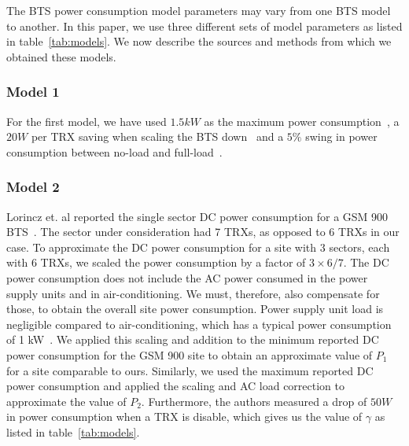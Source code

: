 The BTS power consumption model parameters may vary from one BTS model to another. In this paper, we use three different sets of model parameters as listed in table~\ref{tab:models}. We now describe the sources and methods from which we obtained these models.
\subsubsection{Model 1}
\label{subsubsec:model1}For the first model, we have used $1.5kW$ as the maximum power consumption~\cite{mbakwe:btshybribpower:2011:necec}, a $20W$ per TRX saving when scaling the BTS down~\cite{flexibsc} and a $5\%$ swing in power consumption between no-load and full-load~\cite{Peng:2011:BTSSaving:Mobicom}.

\subsubsection{Model 2}
\label{subsubsec:model2} Lorincz et. al reported the single sector DC power consumption for a GSM 900 BTS~\cite{Lorincz:BTS-Measure:Sensors:2012}. The sector under consideration had 7 TRXs, as opposed to 6 TRXs in our case. To approximate the DC power consumption for a site with 3 sectors, each with 6 TRXs, we scaled the power consumption by a factor of $3\times6/7$. The DC power consumption does not include the AC power consumed in the power supply units and in air-conditioning. We must, therefore, also compensate for those, to obtain the overall site power consumption. Power supply unit load is negligible compared to air-conditioning, which has a typical power consumption of 1 kW~\cite{mbakwe:btshybribpower:2011:necec}. We applied this scaling and addition to the minimum reported DC power consumption for the GSM 900 site to obtain an approximate value of $P_1$ for a site comparable to ours. Similarly, we used the maximum reported DC power consumption and applied the scaling and AC load correction to approximate the value of $P_2$. Furthermore, the authors measured a drop of $50W$ in power consumption when a TRX is disable, which gives us the value of $\gamma$ as listed in table~\ref{tab:models}.

